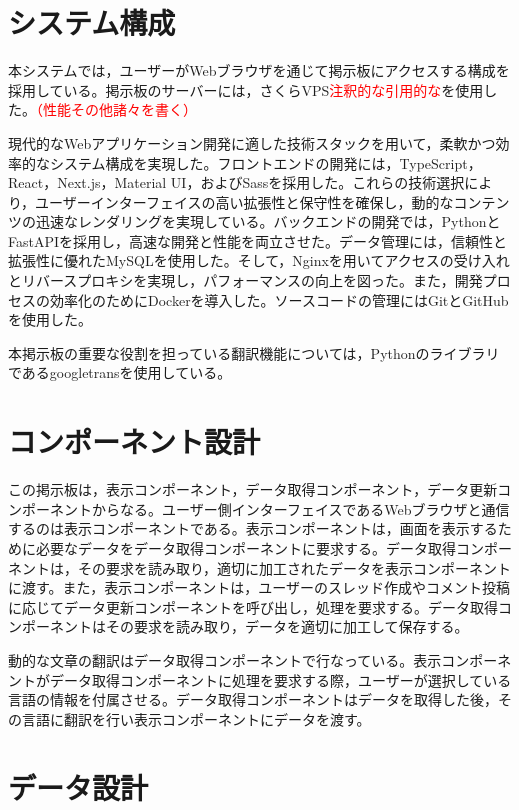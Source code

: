 \documentclass[b5paper,12pt]{jsreport}
\newcommand{\red}[1]{\textcolor{red}{#1}}
\begin{document}
\section{システム構成}

本システムでは，ユーザーがWebブラウザを通じて掲示板にアクセスする構成を採用している。掲示板のサーバーには，さくらVPS\red{注釈的な引用的な}を使用した。\red{（性能その他諸々を書く）}

現代的なWebアプリケーション開発に適した技術スタックを用いて，柔軟かつ効率的なシステム構成を実現した。フロントエンドの開発には，TypeScript，React，Next.js，Material UI，およびSassを採用した。これらの技術選択により，ユーザーインターフェイスの高い拡張性と保守性を確保し，動的なコンテンツの迅速なレンダリングを実現している。バックエンドの開発では，PythonとFastAPIを採用し，高速な開発と性能を両立させた。データ管理には，信頼性と拡張性に優れたMySQLを使用した。そして，Nginxを用いてアクセスの受け入れとリバースプロキシを実現し，パフォーマンスの向上を図った。また，開発プロセスの効率化のためにDockerを導入した。ソースコードの管理にはGitとGitHubを使用した。

本掲示板の重要な役割を担っている翻訳機能については，Pythonのライブラリであるgoogletransを使用している。

\section{コンポーネント設計}

この掲示板は，表示コンポーネント，データ取得コンポーネント，データ更新コンポーネントからなる。ユーザー側インターフェイスであるWebブラウザと通信するのは表示コンポーネントである。表示コンポーネントは，画面を表示するために必要なデータをデータ取得コンポーネントに要求する。データ取得コンポーネントは，その要求を読み取り，適切に加工されたデータを表示コンポーネントに渡す。また，表示コンポーネントは，ユーザーのスレッド作成やコメント投稿に応じてデータ更新コンポーネントを呼び出し，処理を要求する。データ取得コンポーネントはその要求を読み取り，データを適切に加工して保存する。

動的な文章の翻訳はデータ取得コンポーネントで行なっている。表示コンポーネントがデータ取得コンポーネントに処理を要求する際，ユーザーが選択している言語の情報を付属させる。データ取得コンポーネントはデータを取得した後，その言語に翻訳を行い表示コンポーネントにデータを渡す。

\section{データ設計}
\end{document}
